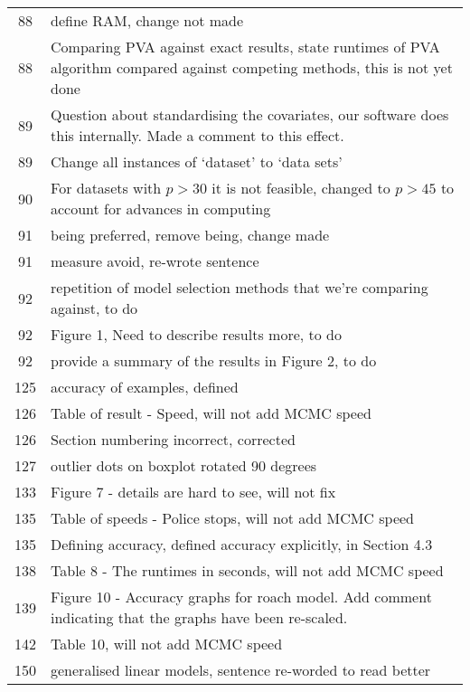 \documentclass{amsart}
\begin{document}
\begin{tabular}{cl}
 88  &  define RAM, change not made\\
 88  &  Comparing PVA against exact results, state runtimes of PVA
			algorithm compared against competing methods, this is not yet done\\
 89  &  Question about standardising the covariates, our software does this
			internally. Made a comment to this effect.\\
 89  &  Change all instances of `dataset' to `data sets'\\
 90  &  For datasets with $p > 30$ it is not feasible, changed to $p > 45$
			to account for advances in computing\\
 91  &  being preferred, remove being, change made\\
 91  &  measure avoid, re-wrote sentence\\
 92  &  repetition of model selection methods that we're comparing against,
			to do\\
 92  &  Figure 1, Need to describe results more, to do\\
 92  &  provide a summary of the results in Figure 2, to do \\
 125  &  accuracy of examples, defined\\
 126  &  Table of result - Speed, will not add MCMC speed\\
 126  &  Section numbering incorrect, corrected\\
 127  &  outlier dots on boxplot rotated 90 degrees\\
 133  &  Figure 7 - details are hard to see, will not fix\\
 135  &  Table of speeds - Police stops, will not add MCMC speed\\
 135  &  Defining accuracy, defined accuracy explicitly, in Section 4.3\\
 138  &  Table 8 - The runtimes in seconds, will not add MCMC speed\\
 139  &  Figure 10 - Accuracy graphs for roach model. Add comment indicating that the graphs have been re-scaled.\\
 142  &  Table 10, will not add MCMC speed\\
 150  &  generalised linear models, sentence re-worded to read better
\end{tabular}
\end{document}
